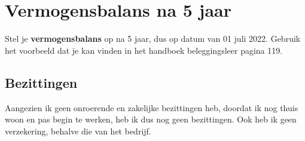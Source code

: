 \newpage
\section{Vermogensbalans na 5 jaar}
Stel je \textbf{vermogensbalans} op na 5 jaar, dus op datum van 01 juli 2022. Gebruik het voorbeeld dat je kan vinden in het handboek beleggingsleer pagina 119.



\subsection{Bezittingen}


%

Aangezien ik geen onroerende en zakelijke bezittingen heb, doordat ik nog thuis woon en pas begin te werken, heb ik dus nog geen bezittingen. Ook heb ik geen verzekering, behalve die van het bedrijf.


